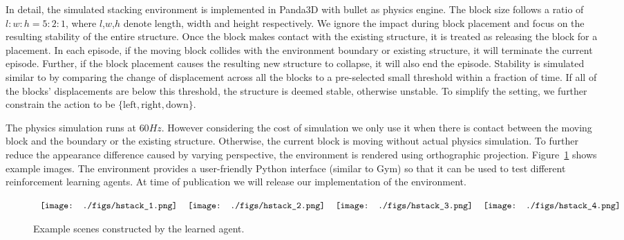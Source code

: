 In detail, the simulated stacking environment is implemented in Panda3D \citep{goslin2004panda3d} with bullet \citep{coumans2010bullet} as physics engine. 
The block size follows a ratio of $l:w:h = 5:2:1$, where $l$,$w$,$h$ denote length, width and height respectively. We ignore the impact during block placement and focus on the resulting stability of the entire structure. Once the block makes contact with the existing structure, it is treated as releasing the block for a placement. In each episode, if the moving block collides with the environment boundary or existing structure, it will terminate the current episode. Further, if the block placement causes the resulting new structure to collapse, it will also end the episode. Stability is simulated similar to \cite{li2017visual} by comparing the change of displacement across all the blocks to a pre-selected small threshold within a fraction of time. If all of the blocks' displacements are below this threshold, the structure is deemed stable, otherwise unstable. To simplify the setting, we further constrain the action to be $\{\text{left},\text{right},\text{down}\}$.

The physics simulation runs at $60Hz$. However considering the cost of simulation we only use it when there is contact between the moving block and the boundary or the existing structure. Otherwise, the current block is moving without actual physics simulation. To further reduce the appearance difference caused by varying perspective, the environment is rendered using orthographic projection. Figure~\ref{fig:scene_sample} shows example images. The environment provides a user-friendly Python interface (similar to  Gym\citep{brockman2016openai}) so that it can be used to test different reinforcement learning agents. At time of publication we will release our implementation of the environment.

\begin{figure}
\begin{center}$
\begin{tabular}{cccc}
\label{fig:hstack1}\texttt{[image: ./figs/hstack\_1.png]}&
\label{fig:hstack2}\texttt{[image: ./figs/hstack\_2.png]}&
\label{fig:hstack3}\texttt{[image: ./figs/hstack\_3.png]}&
\label{fig:hstack4}\texttt{[image: ./figs/hstack\_4.png]}\\
\end{tabular}$
\end{center}
\caption{Example scenes constructed by the learned agent.}
\label{fig:scene_sample}
\end{figure}

